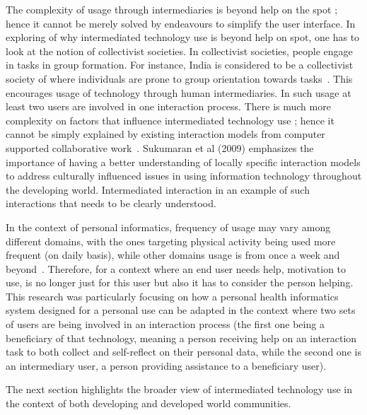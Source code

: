 The complexity of usage through intermediaries is beyond help on the spot \citep{sambasivan2010}; hence it cannot be merely solved by endeavours to simplify the user interface. In exploring of why intermediated technology use is beyond help on spot, one has to look at the notion of collectivist societies. In collectivist societies, people engage in tasks in group formation. For instance, India is considered to be a collectivist society of where individuals are prone to group orientation towards tasks~\citep{parikh2006}. This encourages usage of technology through human intermediaries. In such usage at least two users are involved in one interaction process. There is much more complexity on factors that influence intermediated technology use ; hence it cannot be simply explained by existing interaction models from computer supported collaborative work~\citep{parikh2006}. Sukumaran et al (2009) emphasizes the importance of having a better understanding of locally specific interaction models to address culturally influenced issues in using information technology throughout the developing world. Intermediated interaction in an example of such interactions that needs to be clearly understood.

In the context of personal informatics, frequency of usage may vary among different domains, with the ones targeting physical activity being used more frequent (on daily basis), while other domains usage is from once a week and beyond~\citep{epstein2015lived}. Therefore, for a context where an end user needs help, motivation to use, is no longer just for this user but also it has to consider the person helping. This research was particularly focusing on how a personal health informatics system  designed for a personal use can be adapted in the context where two sets of users are being involved in an interaction process (the first one being a beneficiary of that technology, meaning a person receiving help on an interaction task to both collect and self-reflect on their personal data, while the second one is an intermediary user, a person providing assistance to a beneficiary user).

The next section highlights the broader view of intermediated technology use in the context of both developing and developed world communities.  

